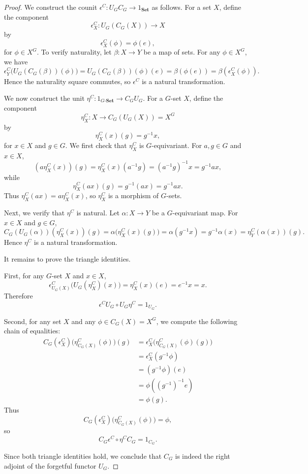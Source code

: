 \documentclass{amsart}
\begin{document}
\begin{proof}
We construct the counit $\epsilon^C \colon U_G C_G \longrightarrow 1_{\mathbf{Set}}$ as follows. 
For a set $X$, define the component 
\[
\epsilon^C_X \colon U_G(C_G(X)) \longrightarrow X
\]
by 
\[
\epsilon^C_X(\phi) = \phi(e),
\]
for $\phi \in X^G$. 
To verify naturality, let $\beta \colon X \rightarrow Y$ be a map of sets. For any $\phi \in X^G$, we have
\[
\epsilon^C_Y\bigl(U_G(C_G(\beta))(\phi)\bigr) 
= U_G(C_G(\beta))(\phi)(e) 
= \beta(\phi(e)) 
= \beta(\epsilon^C_X(\phi)).
\]
Hence the naturality square commutes, so $\epsilon^C$ is a natural transformation.

We now construct the unit $\eta^C \colon 1_{G\text{-}\mathbf{Set}} \longrightarrow C_G U_G$. 
For a $G$-set $X$, define the component 
\[
\eta^C_X \colon X \longrightarrow C_G(U_G(X)) = X^G
\]
by 
\[
\eta^C_X(x)(g) = g^{-1}x,
\]
for $x \in X$ and $g \in G$. 
We first check that $\eta^C_X$ is $G$-equivariant. For $a, g \in G$ and $x \in X$,
\[
(a \eta^C_X(x))(g) = \eta^C_X(x)(a^{-1}g) = (a^{-1}g)^{-1}x = g^{-1}ax,
\]
while
\[
\eta^C_X(ax)(g) = g^{-1}(ax) = g^{-1}ax.
\]
Thus $\eta^C_X(ax) = a \eta^C_X(x)$, so $\eta^C_X$ is a morphism of $G$-sets.

Next, we verify that $\eta^C$ is natural. Let $\alpha \colon X \rightarrow Y$ be a $G$-equivariant map. 
For $x \in X$ and $g \in G$,
\[
C_G(U_G(\alpha))(\eta^C_X(x))(g) 
= \alpha\bigl(\eta^C_X(x)(g)\bigr) 
= \alpha(g^{-1}x) 
= g^{-1}\alpha(x) 
= \eta^C_Y(\alpha(x))(g).
\]
Hence $\eta^C$ is a natural transformation.

It remains to prove the triangle identities.

First, for any $G$-set $X$ and $x \in X$,
\[
\epsilon^C_{U_G(X)}\bigl(U_G(\eta^C_X)(x)\bigr) 
= \eta^C_X(x)(e) 
= e^{-1}x 
= x.
\]
Therefore 
\[
\epsilon^C U_G \circ U_G \eta^C = 1_{U_G}.
\]

Second, for any set $X$ and any $\phi \in C_G(X) = X^G$, we compute the following chain of equalities:
\[
\begin{aligned}
C_G(\epsilon^C_X)\bigl(\eta^C_{C_G(X)}(\phi)\bigr)(g)
  &= \epsilon^C_X\bigl(\eta^C_{C_G(X)}(\phi)(g)\bigr) \\
  &= \epsilon^C_X(g^{-1}\phi) \\
  &= (g^{-1}\phi)(e) \\
  &= \phi((g^{-1})^{-1}e) \\
  &= \phi(g).
\end{aligned}
\]
Thus
\[
C_G(\epsilon^C_X)\bigl(\eta^C_{C_G(X)}(\phi)\bigr) = \phi,
\]
so
\[
C_G \epsilon^C \circ \eta^C C_G = 1_{C_G}.
\]

Since both triangle identities hold, we conclude that $C_G$ is indeed the right adjoint of the forgetful functor $U_G$.
\end{proof}
\end{document}
